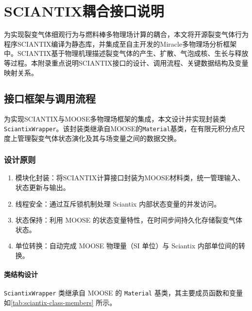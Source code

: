 \chapter{SCIANTIX耦合接口说明}
\label{app:sciantix_interface}

为实现裂变气体细观行为与燃料棒多物理场计算的耦合，本文将开源裂变气体行为程序SCIANTIX编译为静态库，并集成至自主开发的Miracle多物理场分析框架中。SCIANTIX基于物理机理描述裂变气体的产生、扩散、气泡成核、生长与释放等过程。本附录重点说明SCIANTIX接口的设计、调用流程、关键数据结构及变量映射关系。

\section{接口框架与调用流程}
为实现SCIANTIX与MOOSE多物理场框架的集成，本文设计并实现封装类\texttt{SciantixWrapper}。该封装类继承自MOOSE的\texttt{Material}基类，在有限元积分点尺度上管理裂变气体状态演化及其与场变量之间的数据交换。
\subsection{设计原则}
\begin{enumerate}
	\item 模块化封装：将SCIANTIX计算接口封装为MOOSE材料类，统一管理输入、状态更新与输出。
	\item 线程安全：通过互斥锁机制处理 Sciantix 内部状态变量的并发访问。
	\item 状态保持：利用 MOOSE 的状态变量特性，在时间步间持久化存储裂变气体状态。
	\item 单位转换：自动完成 MOOSE 物理量（SI 单位）与 Sciantix 内部单位间的转换。
\end{enumerate}
\subsubsection{类结构设计}

\texttt{SciantixWrapper} 类继承自 MOOSE 的 \texttt{Material} 基类，其主要成员函数和变量如\tablename\ref{tab:sciantix-class-members} 所示。

